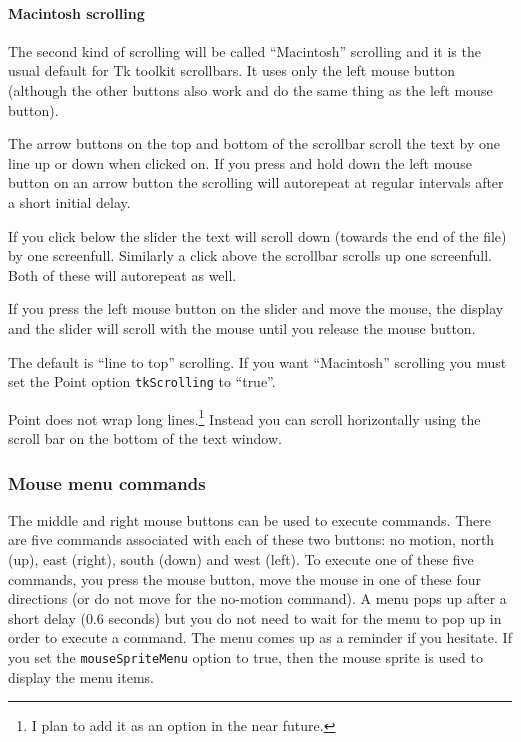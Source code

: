 \paragraph{Macintosh scrolling}

The second kind of scrolling will be called ``Macintosh'' scrolling
and it is the usual default for Tk toolkit scrollbars.
It uses only the left mouse button
(although the other buttons also work and do the same thing
as the left mouse button).

The arrow buttons on the top and bottom of the scrollbar scroll
the text by one line up or down when clicked on.
If you press and hold down the left mouse button on an arrow button
the scrolling will autorepeat at regular intervals after a short
initial delay.

If you click below the slider the text will scroll down
(towards the end of the file) by one screenfull.
Similarly a click above the scrollbar scrolls up one screenfull.
Both of these will autorepeat as well.

If you press the left mouse button on the slider and move the mouse,
the display and the slider will scroll with the mouse
until you release the mouse button.

The default is ``line to top'' scrolling.
If you want ``Macintosh'' scrolling you must set the Point option
{\tt tkScrolling} to ``true''.

Point does not wrap long lines.\footnote{
	I plan to add it as an option in the near future.}
Instead you can scroll horizontally using the scroll bar on the bottom
of the text window.


\subsubsection{Mouse menu commands}

The middle and right mouse buttons can be used to execute commands.
There are five commands associated with each of these two buttons:
no motion, north (up), east (right), south (down) and west (left).
To execute one of these five commands, you press the mouse button,
move the mouse in one of these four directions
(or do not move for the no-motion command).
A menu pops up after a short delay (0.6 seconds)
but you do not need to wait for the menu to pop up in order
to execute a command.
The menu comes up as a reminder if you hesitate.
If you set the {\tt mouseSpriteMenu} option to true,
then the mouse sprite is used to display the menu items.

